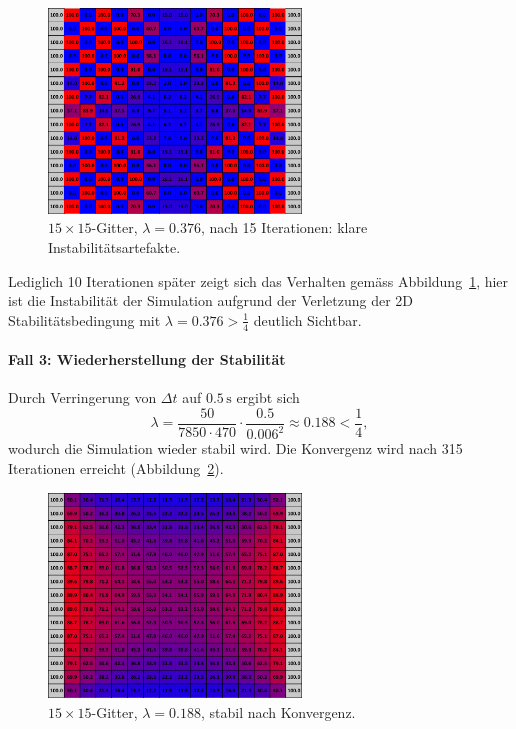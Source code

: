 \begin{figure}[htbp]
	\centering
	\includegraphics[width=0.6\textwidth]{papers/parallelisierung/images/simulation_15x15_0.376_15it.pdf}
	\caption{\(15\times 15\)-Gitter, \(\lambda = 0.376\), nach 15 Iterationen: klare Instabilitätsartefakte.}
	\label{parallelisierung:fig:simulation_15x15_0.376_15it}
\end{figure}

Lediglich 10 Iterationen später zeigt sich das Verhalten gemäss Abbildung~\ref{parallelisierung:fig:simulation_15x15_0.376_15it}, hier ist die Instabilität der Simulation aufgrund der Verletzung der 2D Stabilitätsbedingung mit \(\lambda = 0.376 > \frac{1}{4}\) deutlich Sichtbar.

\paragraph{Fall 3: Wiederherstellung der Stabilität}  
Durch Verringerung von \(\Delta t\) auf \(0.5\,\mathrm{s}\) ergibt sich
\[
\lambda =
\frac{50}{7850 \cdot 470} \cdot \frac{0.5}{0.006^2}
\approx 0.188 < \frac14,
\]
wodurch die Simulation wieder stabil wird. Die Konvergenz wird nach 315 Iterationen erreicht (Abbildung~\ref{parallelisierung:fig:simulation_15x15_0.188_konv}).

\begin{figure}[htbp]
	\centering
	\includegraphics[width=0.6\textwidth]{papers/parallelisierung/images/simulation_15x15_0.188_konv.pdf}
	\caption{\(15\times 15\)-Gitter, \(\lambda = 0.188\), stabil nach Konvergenz.}
	\label{parallelisierung:fig:simulation_15x15_0.188_konv}
\end{figure}
